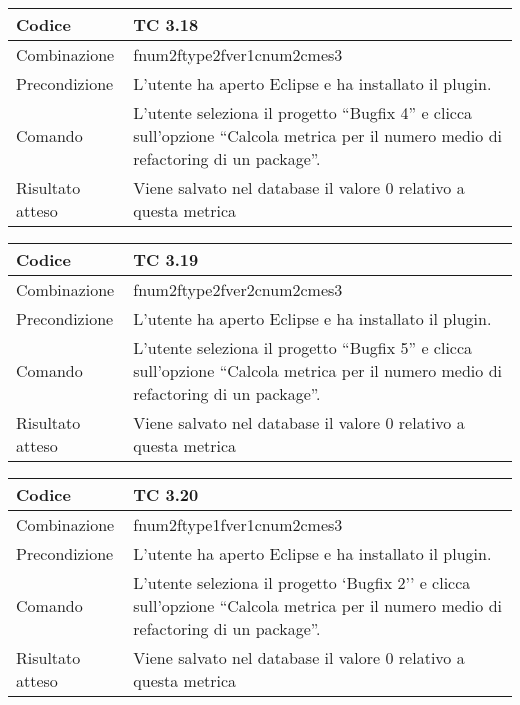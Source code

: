 \begin{table}[ht]
\begin{tabular}{|p{3cm}|p{9cm}|}
\hline
\cellcolor{lightgray}Codice				& TC 3.18								\\
\hline
\cellcolor{lightgray}Combinazione		& fnum2ftype2fver1cnum2cmes3  									\\
\hline
\cellcolor{lightgray}Precondizione		& L'utente ha aperto Eclipse e ha installato il plugin.				\\
\hline
\cellcolor{lightgray}Comando			& L'utente seleziona il progetto ``Bugfix 4''  e clicca sull'opzione ``Calcola metrica per il numero medio di refactoring di un package''.	\\
\hline
\cellcolor{lightgray}Risultato atteso	& Viene salvato nel database il valore 0 relativo a questa metrica	\\
\hline
\end{tabular}
\end{table}

\begin{table}[ht]
\begin{tabular}{|p{3cm}|p{9cm}|}
\hline
\cellcolor{lightgray}Codice				& TC 3.19								\\
\hline
\cellcolor{lightgray}Combinazione		& fnum2ftype2fver2cnum2cmes3 									\\
\hline
\cellcolor{lightgray}Precondizione		& L'utente ha aperto Eclipse e ha installato il plugin.								\\
\hline
\cellcolor{lightgray}Comando			& L'utente seleziona il progetto ``Bugfix 5''  e clicca sull'opzione ``Calcola metrica per il numero medio di refactoring di un package''.	\\
\hline
\cellcolor{lightgray}Risultato atteso	& Viene salvato nel database il valore 0 relativo a questa metrica	\\
\hline
\end{tabular}
\end{table}

\begin{table}[ht]
\begin{tabular}{|p{3cm}|p{9cm}|}
\hline
\cellcolor{lightgray}Codice				& TC 3.20								\\
\hline
\cellcolor{lightgray}Combinazione		& fnum2ftype1fver1cnum2cmes3 									\\
\hline
\cellcolor{lightgray}Precondizione		& L'utente ha aperto Eclipse e ha installato il plugin.									\\
\hline
\cellcolor{lightgray}Comando			& L'utente seleziona il progetto `Bugfix 2''  e clicca sull'opzione ``Calcola metrica per il numero medio di refactoring di un package''.	\\
\hline
\cellcolor{lightgray}Risultato atteso	& Viene salvato nel database il valore 0 relativo a questa metrica	\\
\hline
\end{tabular}
\end{table}

